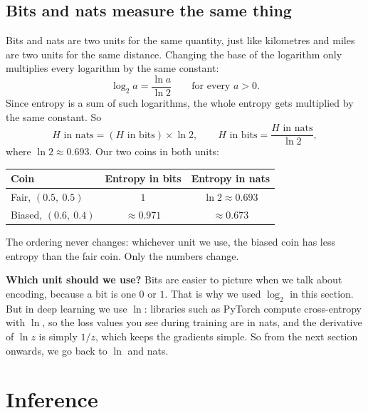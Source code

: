 \documentclass[12pt]{article}
\begin{document}
\subsection*{Bits and nats measure the same thing}

Bits and nats are two units for the same quantity, just like kilometres
and miles are two units for the same distance. Changing the base of the
logarithm only multiplies every logarithm by the same constant:
\begin{equation}
  \log_2 a = \frac{\ln a}{\ln 2}
  \qquad\text{for every } a > 0.
  \label{eq:changebase}
\end{equation}
Since entropy is a sum of such logarithms, the whole entropy gets
multiplied by the same constant. So
\begin{equation}
  H \text{ in nats} = (H \text{ in bits}) \times \ln 2,
  \qquad
  H \text{ in bits} = \frac{H \text{ in nats}}{\ln 2},
  \label{eq:convert}
\end{equation}
where $\ln 2 \approx 0.693$. Our two coins in both units:

\begin{center}
\begin{tabular}{lcc}
  \toprule
  Coin & Entropy in bits & Entropy in nats \\
  \midrule
  Fair, $(0.5,\ 0.5)$   & $1$             & $\ln 2 \approx 0.693$ \\
  Biased, $(0.6,\ 0.4)$ & $\approx 0.971$ & $\approx 0.673$ \\
  \bottomrule
\end{tabular}
\end{center}

The ordering never changes: whichever unit we use, the biased coin has
less entropy than the fair coin. Only the numbers change.

\textbf{Which unit should we use?} Bits are easier to picture when we
talk about encoding, because a bit is one $0$ or $1$. That is why we
used $\log_2$ in this section. But in deep learning we use $\ln$:
libraries such as PyTorch compute cross-entropy with $\ln$, so the loss
values you see during training are in nats, and the derivative of $\ln z$
is simply $1/z$, which keeps the gradients simple. So from
the next section onwards, we go back to $\ln$ and nats.

\section*{Inference}
\end{document}
